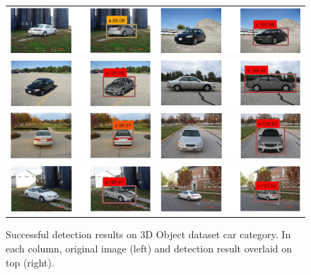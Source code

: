 \documentclass[10pt,twocolumn,letterpaper]{article}
\begin{document}
\begin{figure}[h]
\setlength\tabcolsep{1pt}
\centering
\begin{tabular}{|c|c|}
  \hline
  \includegraphics[width=0.40\linewidth]{supp/car32.png} &
  \includegraphics[width=0.40\linewidth]{supp/car26.png} \\
  \includegraphics[width=0.40\linewidth]{supp/car29.png} & 
  \includegraphics[width=0.40\linewidth]{supp/car10.png} \\
  \includegraphics[width=0.40\linewidth]{supp/car1.png} &
  \includegraphics[width=0.40\linewidth]{supp/car8.png} \\
  \includegraphics[width=0.40\linewidth]{supp/car20.png} & 
  \includegraphics[width=0.40\linewidth]{supp/car31.png} \\
  \hline
  \end{tabular}
\caption{Successful detection results on 3D Object dataset car
category. In each column, original image (left) and detection result overlaid on
top (right).}%
  \label{fig:3dobject_car_good}
\end{figure}
\end{document}
